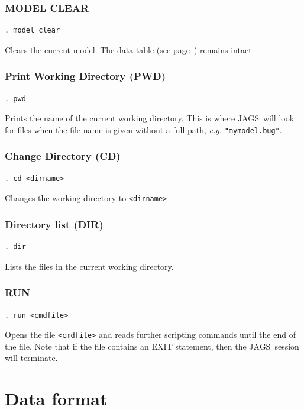 \documentclass[11pt, a4paper, titlepage]{report}
\newcommand{\JAGS}{\textsf{JAGS}}
\begin{document}
\subsubsection{MODEL CLEAR}
\label{model:clear}
\begin{verbatim}
. model clear
\end{verbatim}
Clears the current model.  The data table (see page~\pageref{data:in})
remains intact

\subsubsection{Print Working Directory (PWD)}
\begin{verbatim}
. pwd
\end{verbatim}
Prints the name of the current working directory. This is where \JAGS\
will look for files when the file name is given without a full path, 
{\em e.g.} \verb+"mymodel.bug"+.

\subsubsection{Change Directory (CD)}
\begin{verbatim}
. cd <dirname>
\end{verbatim}
Changes the working directory to \texttt{<dirname>}

\subsubsection{Directory list (DIR)}
\begin{verbatim}
. dir
\end{verbatim}
Lists the files in the current working directory.

\subsubsection{RUN}
\begin{verbatim}
. run <cmdfile>
\end{verbatim}
Opens the file \texttt{<cmdfile>} and reads further scripting commands
until the end of the file.  Note that if the file contains an EXIT
statement, then the \JAGS\ session will terminate. 

\section{Data format}
\label{section:cmdline:data}
\end{document}
